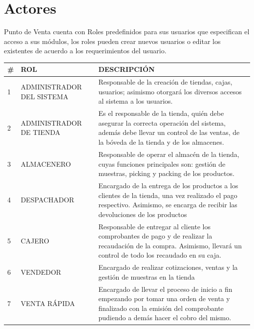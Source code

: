 \documentclass[pdftex,12pt,oneside,a4paper,spanish, english, brazil]{abntex2}
\begin{document}
\begin{sloppypar}
            \section{Actores}
            Punto de Venta cuenta con Roles predefinidos para sus usuarios que especifican el acceso a sus módulos, los roles pueden crear nuevos usuarios o editar los existentes de acuerdo a los requerimientos del usuario.
            \begin{table}[htbp]
            	\small
            	\centering
            	\begin{tabular}{p{0.5cm} p{3.8cm} p{10.5cm}}       		
            		\# & ROL & DESCRIPCIÓN \\
            		\midrule
            		1 &	ADMINISTRADOR DEL SISTEMA & Responsable de la creación de tiendas, cajas, usuarios; asimismo otorgará los diversos accesos al sistema a los usuarios.\\
            		2 &	ADMINISTRADOR DE TIENDA	& Es el responsable de la tienda, quién debe asegurar la correcta operación del sistema, además debe llevar un control de las ventas, de la bóveda de la tienda y de los almacenes. \\
            		3 &	ALMACENERO	& Responsable de operar el almacén de la tienda, cuyas funciones principales son: gestión de muestras, picking y packing de los productos. \\
            		4 &	DESPACHADOR	& Encargado de la entrega de los productos a los clientes de la tienda, una vez realizado el pago respectivo. Asimismo, se encarga de recibir las devoluciones de los productos \\
            		5 &	CAJERO	& Responsable de entregar al cliente los comprobantes de pago y de realizar la recaudación de la compra. Asimismo, llevará un control de todo los recaudado en su caja. \\
            		6 &	VENDEDOR	& Encargado de realizar cotizaciones, ventas y la gestión de muestras en la tienda \\
            		7 &	VENTA RÁPIDA & Encargado de llevar el proceso de inicio a fin empezando por tomar una orden de venta y finalizado con la emisión del comprobante pudiendo a demás hacer el cobro del mismo. \\
            		\bottomrule
            	\end{tabular}%
            \end{table}
        	\newpage

\end{sloppypar}
\end{document}
